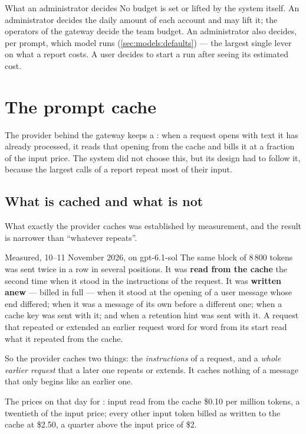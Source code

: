 \begin{humanbox}{What an administrator decides}
No budget is set or lifted by the system itself. An administrator decides the daily amount
of each account and may lift it; the operators of the gateway decide the team budget. An
administrator also decides, per prompt, which model runs (\cref{sec:models:defaults}) --- the
largest single lever on what a report costs. A user decides to start a run after seeing its
estimated cost.
\end{humanbox}


\section{The prompt cache}\label{sec:models:cache}

The provider behind the gateway keeps a : when a request opens with text
it has already processed, it reads that opening from the cache and bills it at a
fraction of the input price. The system did not choose this, but its design had to follow it,
because the largest calls of a report repeat most of their input.

\subsection{What is cached and what is not}

What exactly the provider caches was established by measurement, and the result is narrower
than \enquote{whatever repeats}.

\begin{lessonbox}{Measured, 10--11 November 2026, on gpt-6.1-sol}
The same block of 8\,800 tokens was sent twice in a row in several positions. It was
\textbf{read from the cache} the second time when it stood in the instructions of the
request. It was \textbf{written anew} --- billed in full --- when it stood at the opening of a
user message whose end differed; when it was a message of its own before a different one;
when a cache key was sent with it; and when a retention hint was sent with it. A request that
repeated or extended an earlier request word for word from its start read what it repeated
from the cache.

So the provider caches two things: the \emph{instructions} of a request, and a \emph{whole
earlier request} that a later one repeats or extends. It caches nothing of a message that
only begins like an earlier one.

The prices on that day for : input read from the cache \$0.10 per million
tokens, a twentieth of the input price; every other input token billed as written to the
cache at \$2.50, a quarter above the input price of \$2.
\end{lessonbox}

